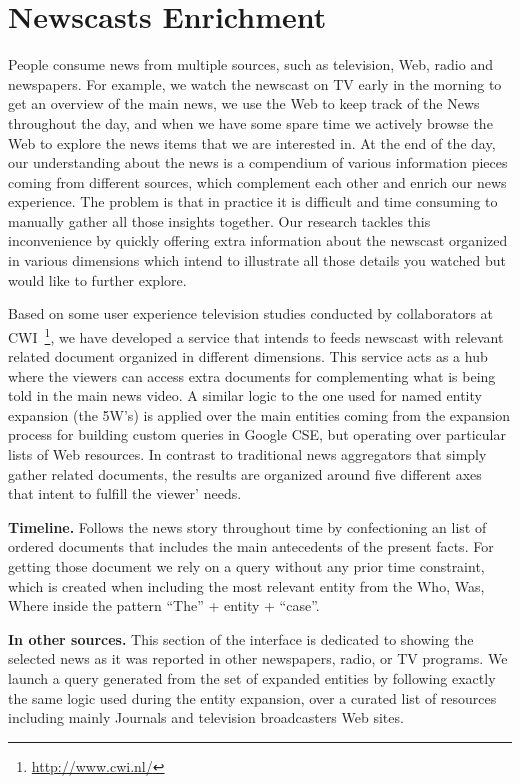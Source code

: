 \documentclass[a4paper,11pt]{report}
\begin{document}
\section* {Newscasts Enrichment}
\label{newscasts}

People consume news from multiple sources, such as television, Web, radio and newspapers. For example, we watch the newscast on TV early in the morning to get an overview of the main news, we use the Web to keep track of the News throughout the day, and when we have some spare time we actively browse the Web to explore the news items that we are interested in. At the end of the day, our understanding about the news is a compendium of various information pieces coming from different sources, which complement each other and enrich our news experience. The problem is that in practice it is difficult and time consuming to manually gather all those insights together. Our research tackles this inconvenience by quickly offering extra information about the newscast organized in various dimensions which intend to illustrate all those details you watched but would like to further explore. 

Based on some user experience television studies conducted by collaborators at CWI~\footnote{\url{http://www.cwi.nl/}}, we have developed a service that intends to feeds newscast with relevant related document organized in different dimensions. This service acts as a hub where the viewers can access extra documents for complementing what is being told in the main news video. A similar logic to the one used for named entity expansion (the 5W's) is applied over the main entities coming from the expansion process for building custom queries in Google CSE, but operating over particular lists of Web resources. In contrast to traditional news aggregators that simply gather related documents, the results are organized around five different axes that intent to fulfill the viewer' needs. 

\textbf{Timeline.} Follows the news story throughout time by confectioning an list of ordered documents that includes the main antecedents of the present facts. For getting those document we rely on a query without any prior time constraint, which is created when including the most relevant entity from the Who, Was, Where inside the pattern ``The'' + entity + ``case''. 

\textbf{In other sources.} This section of the interface is dedicated to showing the selected news as it was reported in other newspapers, radio, or TV programs. We launch a query generated from the set of expanded entities by following exactly the same logic used during the entity expansion, over a curated list of resources including mainly Journals and television broadcasters Web sites. 
\end{document}
